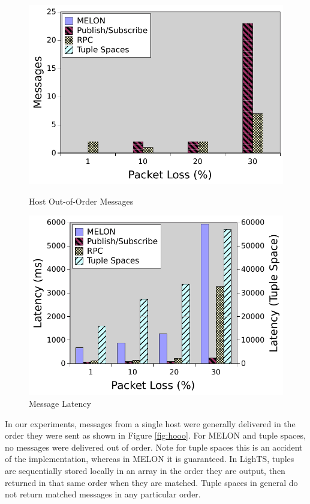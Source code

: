 \documentclass{llncs}
\begin{document}
\begin{figure}[ht]
\centering
\begin{minipage}[b]{0.48\linewidth}
\includegraphics[width = \textwidth]{figures/hooo.pdf}
\caption{Host Out-of-Order Messages}
\label{fig:hooo}
\end{minipage}
\quad
\begin{minipage}[b]{0.48\linewidth}
\includegraphics[width = \textwidth]{figures/latency.pdf}
\caption{Message Latency}
\label{fig:latency}
\end{minipage}
\end{figure}

In our experiments, messages from a single host were generally delivered in the order they were sent as shown in Figure \ref{fig:hooo}. For MELON and tuple spaces, no messages were delivered out of order. Note for tuple spaces this is an accident of the implementation, whereas in MELON it is guaranteed. In LighTS, tuples are sequentially stored locally in an array in the order they are output, then returned in that same order when they are matched. Tuple spaces in general do not return matched messages in any particular order.
\end{document}
